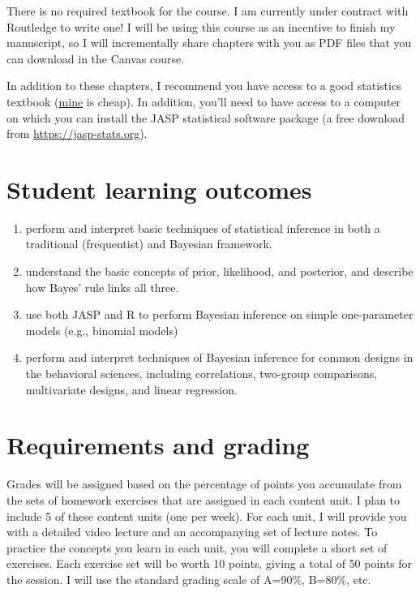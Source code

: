 \documentclass[10pt]{article}
\begin{document}
There is no required textbook for the course. I am currently under contract with Routledge to write one! I will be using this course as an incentive to finish my manuscript, so I will incrementally share chapters with you as PDF files that you can download in the Canvas course.

In addition to these chapters, I recommend you have access to a good statistics textbook (\href{https://www.amazon.com/Psychological-Statistics-Basics-Thomas-Faulkenberry-dp-1032020954/dp/1032020954}{mine} is cheap).  In addition, you'll need to have access to a computer on which you can install the JASP statistical software package (a free download from \url{https://jasp-stats.org}).

\section*{Student learning outcomes}
\label{sec:orga1fca48}

\begin{enumerate}
\item perform and interpret basic techniques of statistical inference in both a traditional (frequentist) and Bayesian framework.
\item understand the basic concepts of prior, likelihood, and posterior, and describe how Bayes' rule links all three.
\item use both JASP and R to perform Bayesian inference on simple one-parameter models (e.g., binomial models)
\item perform and interpret techniques of Bayesian inference for common designs in the behavioral sciences, including correlations, two-group comparisons, multivariate designs, and linear regression.
\end{enumerate}

\section*{Requirements and grading}
\label{sec:org83beaeb}

Grades will be assigned based on the percentage of points you accumulate from the sets of homework exercises that are assigned in each content unit. I plan to include 5 of these content units (one per week). For each unit, I will provide you with a detailed video lecture and an accompanying set of lecture notes. To practice the concepts you learn in each unit, you will complete a short set of exercises.  Each exercise set will be worth 10 points, giving a total of 50 points for the session. I will use the standard grading scale of A=90\%, B=80\%, etc.
\end{document}
